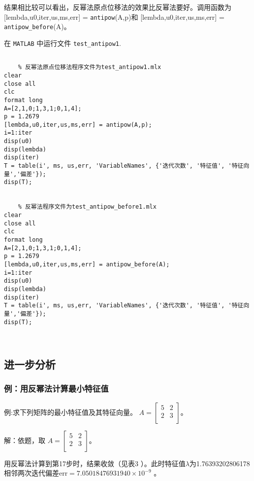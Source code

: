 \documentclass[12pt, a4paper, oneside]{ctexart}
\begin{document}
\begin{table}[h]
	\vspace{1em} %
	结果相比较可以看出，反幂法原点位移法的效果比反幂法要好。调用函数为 [lembda,u0,iter,us,ms,err] = \texttt{antipow}(A,p)和 [lembda,u0,iter,us,ms,err] = \texttt{antipow\_before}(A)。
	
\end{table}

\vspace{1em}


\vspace{1em}
在 \texttt{MATLAB} 中运行文件 \texttt{test\_antipow1}.
\begin{lstlisting}
	
	% 反幂法原点位移法程序文件为test_antipow1.mlx
clear
close all
clc
format long
A=[2,1,0;1,3,1;0,1,4];
p = 1.2679
[lembda,u0,iter,us,ms,err] = antipow(A,p);
i=1:iter
disp(u0)
disp(lembda)
disp(iter)
T = table(i', ms, us,err, 'VariableNames', {'迭代次数', '特征值', '特征向量','偏差'});
disp(T);


	% 反幂法程序文件为test_antipow_before1.mlx
clear
close all
clc
format long
A=[2,1,0;1,3,1;0,1,4];
p = 1.2679
[lembda,u0,iter,us,ms,err] = antipow_before(A);
i=1:iter
disp(u0)
disp(lembda)
disp(iter)
T = table(i', ms, us,err, 'VariableNames', {'迭代次数', '特征值', '特征向量','偏差'});
disp(T);

	
\end{lstlisting}
\subsection{进一步分析}
\subsubsection{例：用反幂法计算最小特征值}

例:求下列矩阵的最小特征值及其特征向量。
$A = \begin{bmatrix}
	5 & 2 \\
	2 & 3 \\
\end{bmatrix}$。


解：依题，取
$A = \begin{bmatrix}
	5 & 2 \\
	2 & 3 \\
\end{bmatrix}$。


用反幂法计算到第17步时，结果收敛（见表3 ）。此时特征值$\lambda$为1.76393202806178  相邻两次迭代偏差$\text{err}  =7.05018476931940\times 10^{-9}$ 。
\end{document}

